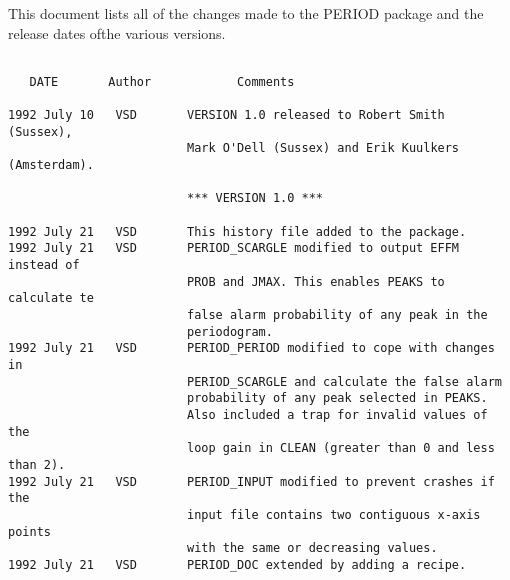 

{\noindent This document lists all of the changes made to the PERIOD
package and the release dates of\newline the various versions.}
\vspace{10mm}



\begin{verbatim}

   DATE       Author            Comments

1992 July 10   VSD       VERSION 1.0 released to Robert Smith (Sussex),
                         Mark O'Dell (Sussex) and Erik Kuulkers (Amsterdam).

                         *** VERSION 1.0 ***

1992 July 21   VSD       This history file added to the package.
1992 July 21   VSD       PERIOD_SCARGLE modified to output EFFM instead of
                         PROB and JMAX. This enables PEAKS to calculate te
                         false alarm probability of any peak in the
                         periodogram.
1992 July 21   VSD       PERIOD_PERIOD modified to cope with changes in
                         PERIOD_SCARGLE and calculate the false alarm
                         probability of any peak selected in PEAKS.
                         Also included a trap for invalid values of the
                         loop gain in CLEAN (greater than 0 and less than 2).
1992 July 21   VSD       PERIOD_INPUT modified to prevent crashes if the
                         input file contains two contiguous x-axis points
                         with the same or decreasing values.
1992 July 21   VSD       PERIOD_DOC extended by adding a recipe.

\end{verbatim}



